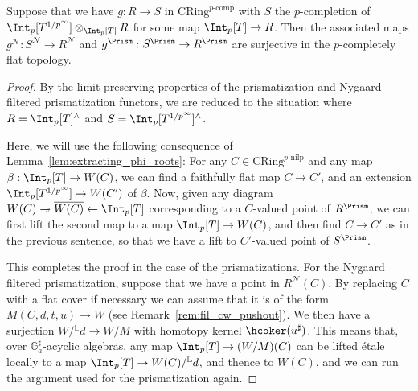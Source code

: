 \documentclass[10pt]{amsart}
\begin{document}
\begin{proposition}
\label{prop:flat_surjections}
Suppose that we have $g:R\to S$ in $\mathrm{CRing}^{p\text{-comp}}$ with $S$ the $p$-completion of $\Int_p[T^{1/p^\infty}]\otimes_{\Int_p[T]}R$ for some map $\Int_p[T]\to R$.  Then the associated maps $g^{\mathcal{N}}:S^{\mathcal{N}}\to R^{\mathcal{N}}$ and $g^{\Prism}:S^{\Prism}\to R^{\Prism}$ are surjective in the $p$-completely flat topology.
\end{proposition}
\begin{proof}
By the limit-preserving properties of the prismatization and Nygaard filtered prismatization functors, we are reduced to the situation where $R = \Int_p[T]^\wedge$ and $S = \Int_p[T^{1/p^\infty}]^\wedge$.


Here, we will use the following consequence of Lemma~\ref{lem:extracting_phi_roots}: For any $C\in \mathrm{CRing}^{p\text{-nilp}}$ and any map $\beta:\Int_p[T]\to W(C)$, we can find a faithfully flat map $C\to C'$, and an extension $\Int_p[T^{1/p^\infty}]\to W(C')$ of $\beta$. Now, given any diagram $W(C)\twoheadrightarrow \overline{W(C)}\leftarrow \Int_p[T]$ corresponding to a $C$-valued point of $R^\Prism$, we can first lift the second map to a map $\Int_p[T]\to W(C)$, and then find $C\to C'$ as in the previous sentence, so that we have a lift to $C'$-valued point of $S^\Prism$.


This completes the proof in the case of the prismatizations. For the Nygaard filtered prismatization, suppose that we have a point in $R^{\mathcal{N}}(C)$. By replacing $C$ with a flat cover if necessary we can assume that it is of the form $M(C,d,t,u)\to W$ (see Remark~\ref{rem:fil_cw_pushout}). We then have a surjection $W/{}^{\mathbb{L}}d\to W/M$ with homotopy kernel $\hcoker(u^\sharp)$. This means that, over $\mathbb{G}_a^\sharp$-acyclic algebras, any map $\Int_p[T]\to (W/M)(C)$ can be lifted \'etale locally to a map $\Int_p[T]\to W(C)/{}^{\mathbb{L}}d$, and thence to $W(C)$, and we can run the argument used for the prismatization again.
\end{proof}
\end{document}
